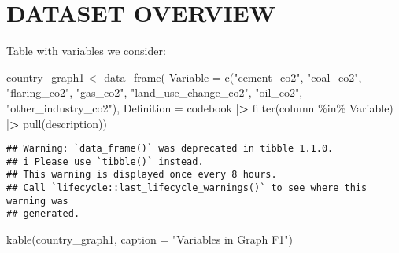 \documentclass[
]{article}
\newenvironment{Shaded}{\begin{snugshade}}{\end{snugshade}}
\newcommand{\AttributeTok}[1]{\textcolor[rgb]{0.77,0.63,0.00}{#1}}
\newcommand{\ErrorTok}[1]{\textcolor[rgb]{0.64,0.00,0.00}{\textbf{#1}}}
\newcommand{\FunctionTok}[1]{\textcolor[rgb]{0.00,0.00,0.00}{#1}}
\newcommand{\NormalTok}[1]{#1}
\newcommand{\OtherTok}[1]{\textcolor[rgb]{0.56,0.35,0.01}{#1}}
\newcommand{\SpecialCharTok}[1]{\textcolor[rgb]{0.00,0.00,0.00}{#1}}
\newcommand{\StringTok}[1]{\textcolor[rgb]{0.31,0.60,0.02}{#1}}
\begin{document}
\hypertarget{dataset-overview}{%
\section{DATASET OVERVIEW}\label{dataset-overview}}

Table with variables we consider:

\begin{Shaded}
\begin{Highlighting}[]
\NormalTok{country\_graph1 }\OtherTok{\textless{}{-}} \FunctionTok{data\_frame}\NormalTok{(}
\AttributeTok{Variable =} \FunctionTok{c}\NormalTok{(}\StringTok{"cement\_co2"}\NormalTok{, }\StringTok{"coal\_co2"}\NormalTok{, }\StringTok{"flaring\_co2"}\NormalTok{, }\StringTok{"gas\_co2"}\NormalTok{, }\StringTok{"land\_use\_change\_co2"}\NormalTok{, }\StringTok{"oil\_co2"}\NormalTok{, }\StringTok{"other\_industry\_co2"}\NormalTok{),}
\AttributeTok{Definition =}\NormalTok{ codebook }\SpecialCharTok{|}\ErrorTok{\textgreater{}} 
  \FunctionTok{filter}\NormalTok{(column }\SpecialCharTok{\%in\%}\NormalTok{ Variable) }\SpecialCharTok{|}\ErrorTok{\textgreater{}}
  \FunctionTok{pull}\NormalTok{(description))}
\end{Highlighting}
\end{Shaded}

\begin{verbatim}
## Warning: `data_frame()` was deprecated in tibble 1.1.0.
## i Please use `tibble()` instead.
## This warning is displayed once every 8 hours.
## Call `lifecycle::last_lifecycle_warnings()` to see where this warning was
## generated.
\end{verbatim}

\begin{Shaded}
\begin{Highlighting}[]
\FunctionTok{kable}\NormalTok{(country\_graph1, }\AttributeTok{caption =} \StringTok{"Variables in Graph F1"}\NormalTok{)}
\end{Highlighting}
\end{Shaded}
\end{document}
